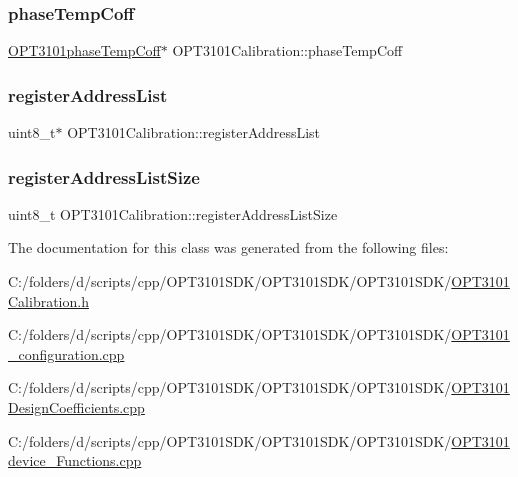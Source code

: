 \subsubsection{\texorpdfstring{phase\+Temp\+Coff}{phaseTempCoff}}
{\footnotesize\ttfamily \mbox{\hyperlink{class_o_p_t3101phase_temp_coff}{O\+P\+T3101phase\+Temp\+Coff}}$\ast$ O\+P\+T3101\+Calibration\+::phase\+Temp\+Coff}

\mbox{\label{class_o_p_t3101_calibration_a111d227d3f19d98a2822d130850f3513}} 
\subsubsection{\texorpdfstring{register\+Address\+List}{registerAddressList}}
{\footnotesize\ttfamily uint8\+\_\+t$\ast$ O\+P\+T3101\+Calibration\+::register\+Address\+List}

\mbox{\label{class_o_p_t3101_calibration_a47b0caca3d9ccfa37b6094a86e1f1235}} 
\subsubsection{\texorpdfstring{register\+Address\+List\+Size}{registerAddressListSize}}
{\footnotesize\ttfamily uint8\+\_\+t O\+P\+T3101\+Calibration\+::register\+Address\+List\+Size}



The documentation for this class was generated from the following files\+:\begin{DoxyCompactItemize}
\item 
C\+:/folders/d/scripts/cpp/\+O\+P\+T3101\+S\+D\+K/\+O\+P\+T3101\+S\+D\+K/\+O\+P\+T3101\+S\+D\+K/\mbox{\hyperlink{_o_p_t3101_calibration_8h}{O\+P\+T3101\+Calibration.\+h}}\item 
C\+:/folders/d/scripts/cpp/\+O\+P\+T3101\+S\+D\+K/\+O\+P\+T3101\+S\+D\+K/\+O\+P\+T3101\+S\+D\+K/\mbox{\hyperlink{_o_p_t3101__configuration_8cpp}{O\+P\+T3101\+\_\+configuration.\+cpp}}\item 
C\+:/folders/d/scripts/cpp/\+O\+P\+T3101\+S\+D\+K/\+O\+P\+T3101\+S\+D\+K/\+O\+P\+T3101\+S\+D\+K/\mbox{\hyperlink{_o_p_t3101_design_coefficients_8cpp}{O\+P\+T3101\+Design\+Coefficients.\+cpp}}\item 
C\+:/folders/d/scripts/cpp/\+O\+P\+T3101\+S\+D\+K/\+O\+P\+T3101\+S\+D\+K/\+O\+P\+T3101\+S\+D\+K/\mbox{\hyperlink{_o_p_t3101device___functions_8cpp}{O\+P\+T3101device\+\_\+\+Functions.\+cpp}}\end{DoxyCompactItemize}
